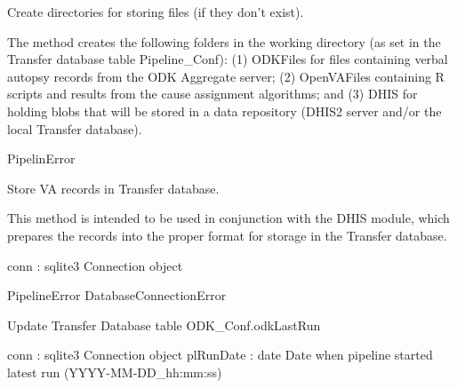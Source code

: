 \documentclass[letterpaper,12pt,english]{sphinxmanual}
\begin{document}
\begin{fulllineitems}
\begin{fulllineitems}
\label{\detokenize{help:transferDB.TransferDB.makePipelineDirs}}
Create directories for storing files (if they don’t exist).

The method creates the following folders in the working directory (as
set in the Transfer database table Pipeline\_Conf): (1) ODKFiles for
files containing verbal autopsy records from the ODK Aggregate server; (2)
OpenVAFiles containing R scripts and results from the cause assignment
algorithms; and (3) DHIS for holding blobs that will be stored in a
data repository (DHIS2 server and/or the local Transfer database).

PipelinError

\end{fulllineitems}


\begin{fulllineitems}
\label{\detokenize{help:transferDB.TransferDB.storeVA}}
Store VA records in Transfer database.

This method is intended to be used in conjunction with the DHIS module,
which prepares the records into the proper format for storage in the
Transfer database.

conn : sqlite3 Connection object

PipelineError
DatabaseConnectionError

\end{fulllineitems}


\begin{fulllineitems}
\label{\detokenize{help:transferDB.TransferDB.updateODKLastRun}}
Update Transfer Database table ODK\_Conf.odkLastRun

conn : sqlite3 Connection object
plRunDate : date
Date when pipeline started latest run (YYYY-MM-DD\_hh:mm:ss)

\end{fulllineitems}


\end{fulllineitems}
\end{document}
